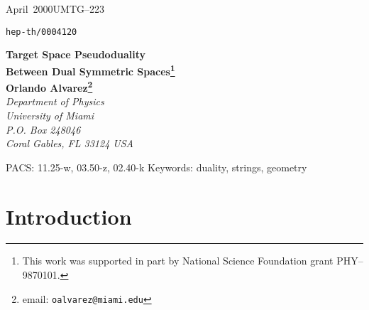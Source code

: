 \documentclass[a4paper,12pt]{article}
\providecommand{\Mtil}{\widetilde{M}}
\begin{document}
\begin{titlepage}
\mbox{April 2000}\hfill\mbox{UMTG--223}\newline
\strut\hfill\mbox{\tt hep-th/0004120}
\par\vspace{.5in}
\begin{center}
    {\bf\large Target Space Pseudoduality}\\
    {\bf\large Between Dual Symmetric Spaces\footnote{This work
    was supported in part by National Science Foundation grant
    PHY--9870101.}}\\[.4in]
    {\bf Orlando Alvarez\footnote{email: 
    \texttt{oalvarez@miami.edu}}}\\
    {\em Department of Physics}\\
    {\em University of Miami}\\
    {\em P.O. Box 248046}\\
    {\em Coral Gables, FL 33124 USA}\\
\end{center}

\vspace{.5in}
\begin{abstract}
A  set of on shell duality equations is proposed that leads to a
map between strings moving on symmetric spaces with opposite
curvatures.  The transformation maps ``waves'' on a riemannian
symmetric space \coordHE{} to ``waves'' on its dual riemannian symmetric
space \myHighlight{$\Mtil$}\coordHE{}.  This transformation preserves the energy momentum
tensor though it is not a canonical transformation.  The preservation
of the energy momentum tensor has a natural geometrical
interpretation. The transformation maps ``particle-like solutions'' into 
static ``soliton-like solutions''. The results presented here 
generalize earlier results of E.~Ivanov.
\end{abstract}

\vspace{.5in}
\noindent
PACS: 11.25-w, 03.50-z, 02.40-k\newline
Keywords: duality, strings, geometry

\end{titlepage}

\section{Introduction}
\label{sec:intro}
\end{document}
